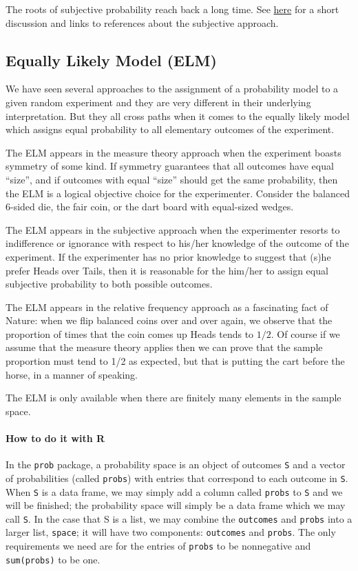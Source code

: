 \documentclass[captions=tableheading]{scrbook}
\begin{document}
The roots of subjective probability reach back a long time. See \href{http://en.wikipedia.org/wiki/Subjective_probability}{here} for a short discussion and links to references about the subjective approach.
\subsection{Equally Likely Model (ELM)}
\label{sec-3-3-4}


We have seen several approaches to the assignment of a probability model to a given random experiment and they are very different in their underlying interpretation. But they all cross paths when it comes to the equally likely model which assigns equal probability to all elementary outcomes of the experiment.

The ELM appears in the measure theory approach when the experiment boasts symmetry of some kind. If symmetry guarantees that all outcomes have equal ``size'', and if outcomes with equal ``size'' should get the same probability, then the ELM is a logical objective choice for the experimenter. Consider the balanced 6-sided die, the fair coin, or the dart board with equal-sized wedges.

The ELM appears in the subjective approach when the experimenter resorts to indifference or ignorance with respect to his/her knowledge of the outcome of the experiment. If the experimenter has no prior knowledge to suggest that (s)he prefer Heads over Tails, then it is reasonable for the him/her to assign equal subjective probability to both possible outcomes.

The ELM appears in the relative frequency approach as a fascinating fact of Nature: when we flip balanced coins over and over again, we observe that the proportion of times that the coin comes up Heads tends to \(1/2\). Of course if we assume that the measure theory applies then we can prove that the sample proportion must tend to 1/2 as expected, but that is putting the cart before the horse, in a manner of speaking.

The ELM is only available when there are finitely many elements in the sample space.

\paragraph*{How to do it with \textsf{R}}

In the \texttt{prob} package, a probability space is an object of outcomes \texttt{S} and a vector of probabilities (called \texttt{probs}) with entries that correspond to each outcome in \texttt{S}. When \texttt{S} is a data frame, we may simply add a column called \texttt{probs} to \texttt{S} and we will be finished; the probability space will simply be a data frame which we may call \texttt{S}. In the case that S is a list, we may combine the \texttt{outcomes} and \texttt{probs} into a larger list, \texttt{space}; it will have two components: \texttt{outcomes} and \texttt{probs}. The only requirements we need are for the entries of \texttt{probs} to be nonnegative and \texttt{sum(probs)} to be one.
\end{document}
